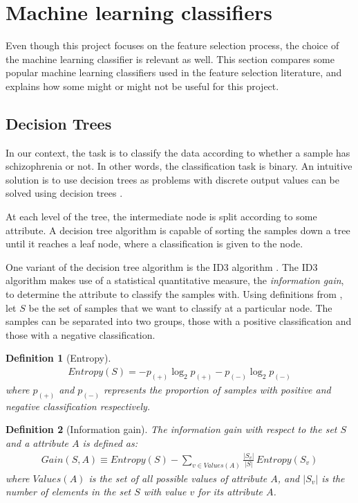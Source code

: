 \documentclass[12pt, twoside, a4paper]{report}
\begin{document}
\section{Machine learning classifiers} \label{bg_ML}
Even though this project focuses on the feature selection process, the choice of the machine learning classifier is relevant as well. This section compares some popular machine learning classifiers used in the feature selection literature, and explains how some might or might not be useful for this project.

\subsection{Decision Trees} \label{bg:ml:decisionTree}
In our context, the task is to classify the data according to whether a sample has schizophrenia or not. In other words, the classification task is binary. An intuitive solution is to use decision trees as problems with discrete output values can be solved using decision trees \cite{RefWorks:98}.

At each level of the tree, the intermediate node is split according to some attribute. A decision tree algorithm is capable of sorting the samples down a tree until it reaches a leaf node, where a classification is given to the node. 

One variant of the decision tree algorithm is the ID3 algorithm \cite{RefWorks:99}. The ID3 algorithm makes use of a statistical quantitative measure, the \textit{information gain}, to determine the attribute to classify the samples with. Using definitions from \cite{RefWorks:98}, let $S$ be the set of samples that we want to classify at a particular node. The samples can be separated into two groups, those with a positive classification and those with a negative classification.\\

\newtheorem{mydef}{Definition}[subsection]

\begin{mydef}[Entropy]
\begin{align*}
Entropy(S) = -p_{(+)} \log_2 p_{(+)} - p_{(-)} \log_2 p_{(-)}
\end{align*}
where $p_{(+)}$ and $p_{(-)}$ represents the proportion of samples with positive and negative classification respectively.\\
\end{mydef}

\begin{mydef}[Information gain]
The information gain with respect to the set $S$ and a attribute $A$ is defined as:
\begin{align*}
Gain(S, A) \equiv Entropy(S) - \sum_{v \in Values(A)} \frac{|S_v|}{|S|} \, Entropy(S_v)
\end{align*}
where $Values(A)$ is the set of all possible values of attribute $A$, and $|S_v|$ is the number of elements in the set $S$ with value $v$ for its attribute $A$.
\label{bg:id3:ig}
\end{mydef}
\end{document}

